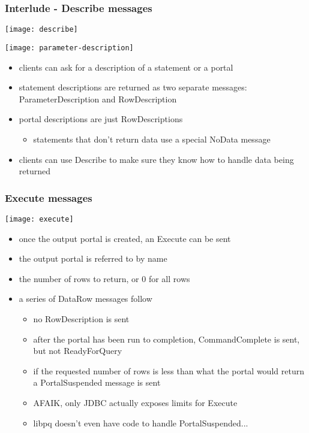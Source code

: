 \documentclass{beamer}
\begin{document}
\begin{frame}
  \frametitle{Interlude - Describe messages}


  \begin{center}
    \texttt{[image: describe]} \\

    \bigskip

    \texttt{[image: parameter-description]}
  \end{center}

  \begin{itemize}
  \item clients can ask for a description of a statement or a portal
  \item statement descriptions are returned as two separate messages:
    ParameterDescription and RowDescription
  \item portal descriptions are just RowDescriptions
    \begin{itemize}
    \item statements that don't return data use a special NoData message
    \end{itemize}
  \item clients can use Describe to make sure they know how to handle data
    being returned
  \end{itemize}
\end{frame}

\begin{frame}
  \frametitle{Execute messages}

  \begin{center}
    \texttt{[image: execute]}
  \end{center}

  \begin{itemize}
  \item once the output portal is created, an Execute can be sent
  \item the output portal is referred to by name
  \item the number of rows to return, or 0 for all rows
  \item a series of DataRow messages follow
    \begin{itemize}
    \item no RowDescription is sent
    \item after the portal has been run to completion, CommandComplete is sent,
      but not ReadyForQuery
    \item if the requested number of rows is less than what the portal would
      return a PortalSuspended message is sent
    \item AFAIK, only JDBC actually exposes limits for Execute
    \item libpq doesn't even have code to handle PortalSuspended...
    \end{itemize}
  \end{itemize}
\end{frame}
\end{document}
